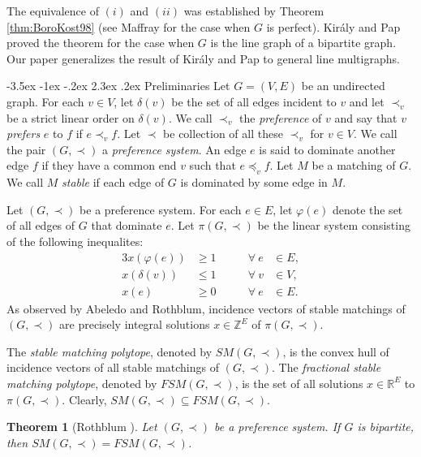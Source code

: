 \documentclass[11pt]{article}
\makeatletter
\newtheorem{theorem}{Theorem}%
\numberwithin{theorem}{section}
\renewcommand\section{%
  \@startsection{section}{1}
                {\z@}%
                {-3.5ex \@plus -1ex \@minus -.2ex}%
                {2.3ex \@plus.2ex}%
                {\large\bfseries}%
}
\makeatother
\begin{document}
The equivalence of $(i)$ and $(ii)$ was established by Theorem \ref{thm:BoroKost98} (see Maffray \cite{Maff92} for the case when $G$ is perfect). Kir\'{a}ly and Pap \cite{KiraPap08} proved the theorem for the case when $G$ is the line graph of a bipartite graph.	 Our paper generalizes the result of Kir\'{a}ly and Pap to general line multigraphs.


\section{Preliminaries}
\label{pre}
Let $G=(V,E)$ be an undirected graph. For each $v\in V$, let $\delta(v)$ be the set of all edges incident to $v$ and let $\prec_v$ be a strict linear order on $\delta(v)$. We call $\prec_v$ the \emph{preference} of $v$ and say that $v$ \emph{prefers} $e$ to $f$ if $e\prec_v f$. Let $\prec$ be collection of all these $\prec_v$ for $v\in V$. We call the pair $(G,\prec)$ a \emph{preference system}. An edge $e$ is said to dominate another edge $f$ if they have a common end $v$ such that $e\preceq_v f$. Let $M$ be a matching of $G$. We call $M$ \emph{stable} if each edge of $G$ is dominated by some edge in $M$.

Let $(G,\prec)$ be a preference system. For each $e\in E$, let $\varphi(e)$ denote the set of all edges of $G$ that dominate $e$. Let $\pi(G,\prec)$ be the linear system consisting of the following inequalites:
\begin{alignat}{3}
x(\varphi(e)) &\geq 1 &\qquad \forall ~e &\in E,\label{stability constraints}\\
x(\delta(v)) &\leq 1 &\qquad \forall ~v &\in V,\label{matching constraints}\\
x(e) &\geq 0 &\qquad \forall ~e &\in E.\label{edge nonnegativity}
\end{alignat}
As observed by Abeledo and Rothblum, incidence vectors of stable matchings of $(G,\prec)$ are precisely integral solutions $x\in \mathbb{Z}^E$ of $\pi(G,\prec)$.

The \textit{stable matching polytope}, denoted by $SM(G,\prec)$, is the convex hull of incidence vectors of all stable matchings of $(G,\prec)$. The \textit{fractional stable matching polytope}, denoted by $FSM(G,\prec)$, is the set of all solutions $x\in \mathbb{R}^E$ to $\pi(G,\prec)$. Clearly, $SM(G,\prec)\subseteq FSM(G,\prec)$. 

\begin{theorem}[Rothblum \cite{Roth92}]
\label{thm:Roth92}
Let $(G,\prec)$ be a preference system. If $G$ is bipartite, then
$SM(G,\prec)=FSM(G,\prec)$.
\end{theorem}
\end{document}
